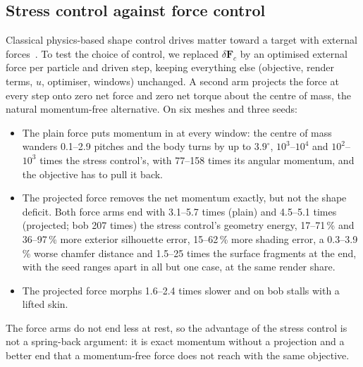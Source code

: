 \subsection{Stress control against force control}
Classical physics-based shape control drives matter toward a target with external
forces~\citep{treuille2003keyframe,mcnamara2004adjoint,fattal2004targetdriven,chen2024eigenfluids,li2025flowmapadjoint}.
To test the choice of control, we replaced $\delta\mathbf{F}_c$ by an optimised external force per particle and driven
step, keeping everything else (objective, render terms, $u$, optimiser, windows) unchanged. A second arm projects the
force at every step onto zero net force and zero net torque about the centre of mass, the natural momentum-free
alternative. On six meshes and three seeds:
\begin{itemize}
  \item The plain force puts momentum in at every window: the centre of mass wanders 0.1--2.9 pitches and the body turns by
        up to $3.9^\circ$, $10^3$--$10^4$ and $10^2$--$10^3$ times the stress control's, with 77--158 times its angular
        momentum, and the objective has to pull it back.
  \item The projected force removes the net momentum exactly, but not the shape deficit. Both force arms end with
        3.1--5.7 times (plain) and 4.5--5.1 times (projected; bob 207 times) the stress control's geometry energy,
        17--71\,\% and 36--97\,\% more exterior silhouette error, 15--62\,\% more shading error, a 0.3--3.9\,\% worse chamfer
        distance and 1.5--25 times the surface fragments at the end, with the seed ranges apart in all but one case,
        at the same render share.
  \item The projected force morphs 1.6--2.4 times slower and on bob stalls with a lifted skin.
\end{itemize}
The force arms do not end less at rest, so the advantage of the stress control is not a spring-back argument: it is exact
momentum without a projection and a better end that a momentum-free force does not reach with the same objective.

